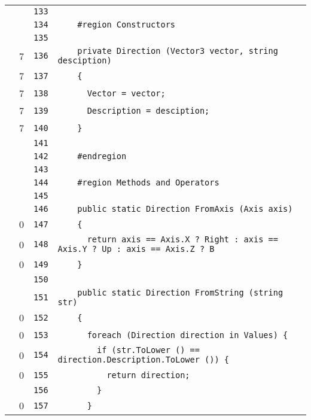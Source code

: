 \documentclass[a4paper,10pt]{article}
\begin{document}
\begin{longtable}[l]{lrrl}
\cellcolor{gray} &  & \verb~133~ & \verb~~\\
\cellcolor{gray} &  & \verb~134~ & \verb~    #region Constructors~\\
\cellcolor{gray} &  & \verb~135~ & \verb~~\\
\cellcolor{green} & 7 & \verb~136~ & \verb~    private Direction (Vector3 vector, string desciption)~\\
\cellcolor{green} & 7 & \verb~137~ & \verb~    {~\\
\cellcolor{green} & 7 & \verb~138~ & \verb~      Vector = vector;~\\
\cellcolor{green} & 7 & \verb~139~ & \verb~      Description = desciption;~\\
\cellcolor{green} & 7 & \verb~140~ & \verb~    }~\\
\cellcolor{gray} &  & \verb~141~ & \verb~~\\
\cellcolor{gray} &  & \verb~142~ & \verb~    #endregion~\\
\cellcolor{gray} &  & \verb~143~ & \verb~~\\
\cellcolor{gray} &  & \verb~144~ & \verb~    #region Methods and Operators~\\
\cellcolor{gray} &  & \verb~145~ & \verb~~\\
\cellcolor{gray} &  & \verb~146~ & \verb~    public static Direction FromAxis (Axis axis)~\\
\cellcolor{red} & 0 & \verb~147~ & \verb~    {~\\
\cellcolor{red} & 0 & \verb~148~ & \verb~      return axis == Axis.X ? Right : axis == Axis.Y ? Up : axis == Axis.Z ? B~\\
\cellcolor{red} & 0 & \verb~149~ & \verb~    }~\\
\cellcolor{gray} &  & \verb~150~ & \verb~~\\
\cellcolor{gray} &  & \verb~151~ & \verb~    public static Direction FromString (string str)~\\
\cellcolor{red} & 0 & \verb~152~ & \verb~    {~\\
\cellcolor{red} & 0 & \verb~153~ & \verb~      foreach (Direction direction in Values) {~\\
\cellcolor{red} & 0 & \verb~154~ & \verb~        if (str.ToLower () == direction.Description.ToLower ()) {~\\
\cellcolor{red} & 0 & \verb~155~ & \verb~          return direction;~\\
\cellcolor{gray} &  & \verb~156~ & \verb~        }~\\
\cellcolor{red} & 0 & \verb~157~ & \verb~      }~\\

\end{longtable}
\end{document}
